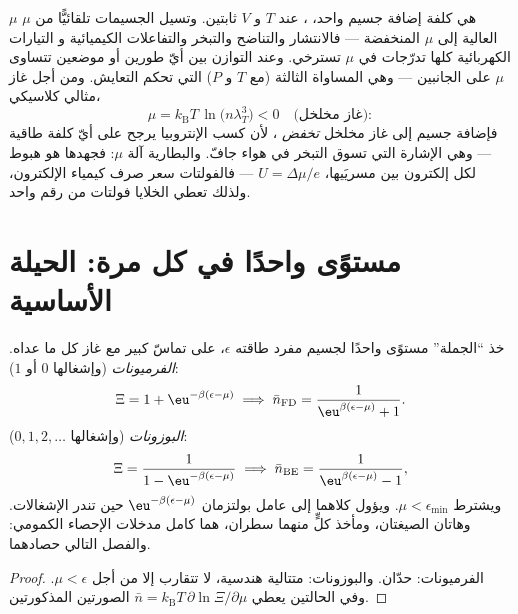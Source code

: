 \begin{definition}[ما معنى $\mu$]\label{def:b3:grand-canonical:mu}
$\mu$ هي كلفة إضافة جسيم واحد، ، عند
$T$ و $V$ ثابتين. وتسيل الجسيمات تلقائيًّا من $\mu$ العالية إلى $\mu$
المنخفضة --- فالانتشار والتناضح والتبخر والتفاعلات الكيميائية و
التيارات الكهربائية كلها تدرّجات في $\mu$ تسترخي. وعند التوازن
بين أيّ طورين أو موضعين تتساوى $\mu$ على الجانبين ---
وهي المساواة الثالثة (مع $T$ و $P$) التي تحكم التعايش. ومن أجل
غاز مثالي كلاسيكي،
\[
\mu = k_{\text{B}}T\,\ln\!\big(n\lambda_T^3\big) < 0
\quad\text{(غاز مخلخل)} :
\]
فإضافة جسيم إلى غاز مخلخل \emph{تخفض} ،
لأن كسب الإنتروبيا يرجح على أيّ كلفة طاقية --- وهي الإشارة التي
تسوق التبخر في هواء جافّ. والبطارية آلة $\mu$:
فجهدها هو هبوط  لكل إلكترون بين
مسريَيها، $U = \Delta\mu/e$ --- فالفولتات سعر صرف كيمياء
الإلكترون، ولذلك تعطي الخلايا فولتات من رقم واحد.
\end{definition}

\section{مستوًى واحدًا في كل مرة: الحيلة الأساسية}

\begin{theorem}\label{thm:b3:grand-canonical:occupation}
خذ ``الجملة'' مستوًى واحدًا لجسيم مفرد طاقته
$\epsilon$، على تماسّ كبير مع غاز كل ما عداه.
\emph{الفرميونات} (وإشغالها $0$ أو $1$):
\[
\Xi = 1 + \eu^{-\beta(\epsilon - \mu)}
\;\Longrightarrow\;
\bar n_{\text{FD}} = \frac{1}{\eu^{\beta(\epsilon - \mu)} + 1} .
\]
\emph{البوزونات} (وإشغالها $0, 1, 2, \dots$):
\[
\Xi = \frac{1}{1 - \eu^{-\beta(\epsilon - \mu)}}
\;\Longrightarrow\;
\bar n_{\text{BE}} = \frac{1}{\eu^{\beta(\epsilon - \mu)} - 1} ,
\]
ويشترط $\mu < \epsilon_{\min}$. ويؤول كلاهما إلى عامل
بولتزمان $\eu^{-\beta(\epsilon - \mu)}$ حين تندر الإشغالات.
وهاتان الصيغتان، ومأخذ كلٍّ منهما سطران، هما كامل
مدخلات الإحصاء الكمومي: والفصل التالي حصادهما.
\end{theorem}

\begin{proof}
الفرميونات: حدّان. والبوزونات: متتالية هندسية، لا تتقارب إلا
من أجل $\mu < \epsilon$. وفي الحالتين يعطي $\bar n = k_{\text{B}}T\,
\partial\ln\Xi/\partial\mu$ الصورتين المذكورتين.
\end{proof}

